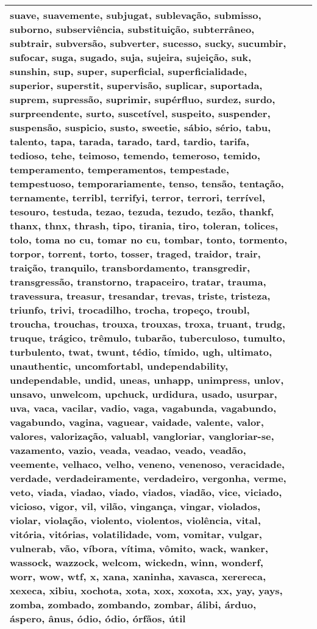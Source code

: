 \begin{longtable}{|*3{p{15cm}|}}
suave, suavemente, subjugat, sublevação, submisso, suborno, subserviência, substituição, subterrâneo, subtrair, subversão, subverter, sucesso, sucky, sucumbir, sufocar, suga, sugado, suja, sujeira, sujeição, suk, sunshin, sup, super, superficial, superficialidade, superior, superstit, supervisão, suplicar, suportada, suprem, supressão, suprimir, supérfluo, surdez, surdo, surpreendente, surto, suscetível, suspeito, suspender, suspensão, suspicio, susto, sweetie, sábio, sério, tabu, talento, tapa, tarada, tarado, tard, tardio, tarifa, tedioso, tehe, teimoso, temendo, temeroso, temido, temperamento, temperamentos, tempestade, tempestuoso, temporariamente, tenso, tensão, tentação, ternamente, terribl, terrifyi, terror, terrori, terrível, tesouro, testuda, tezao, tezuda, tezudo, tezão, thankf, thanx, thnx, thrash, tipo, tirania, tiro, toleran, tolices, tolo, toma no cu, tomar no cu, tombar, tonto, tormento, torpor, torrent, torto, tosser, traged, traidor, trair, traição, tranquilo, transbordamento, transgredir, transgressão, transtorno, trapaceiro, tratar, trauma, travessura, treasur, tresandar, trevas, triste, tristeza, triunfo, trivi, trocadilho, trocha, tropeço, troubl, troucha, trouchas, trouxa, trouxas, troxa, truant, trudg, truque, trágico, trêmulo, tubarão, tuberculoso, tumulto, turbulento, twat, twunt, tédio, tímido, ugh, ultimato, unauthentic, uncomfortabl, undependability, undependable, undid, uneas, unhapp, unimpress, unlov, unsavo, unwelcom, upchuck, urdidura, usado, usurpar, uva, vaca, vacilar, vadio, vaga, vagabunda, vagabundo, vagabundo, vagina, vaguear, vaidade, valente, valor, valores, valorização, valuabl, vangloriar, vangloriar-se, vazamento, vazio, veada, veadao, veado, veadão, veemente, velhaco, velho, veneno, venenoso, veracidade, verdade, verdadeiramente, verdadeiro, vergonha, verme, veto, viada, viadao, viado, viados, viadão, vice, viciado, vicioso, vigor, vil, vilão, vingança, vingar, violados, violar, violação, violento, violentos, violência, vital, vitória, vitórias, volatilidade, vom, vomitar, vulgar, vulnerab, vão, víbora, vítima, vômito, wack, wanker, wassock, wazzock, welcom, wickedn, winn, wonderf, worr, wow, wtf, x, xana, xaninha, xavasca, xerereca, xexeca, xibiu, xochota, xota, xox, xoxota, xx, yay, yays, zomba, zombado, zombando, zombar, álibi, árduo, áspero, ânus, ódio, ódio, órfãos, útil \\ \hline   
     
    \end{longtable}

\begin{comment}
\apendice{APÊNDICE B}
\addcontentsline{toc}{section}{APÊNDICE B}

Contém materiais de leitura opcional e complementar produzidos pelo autor da pesquisa, incluindo os instrumentos de coleta de dados a serem utilizados. Se não for utilizada, esta seção deve ser removida já na versão 1 do projeto.
\end{comment}